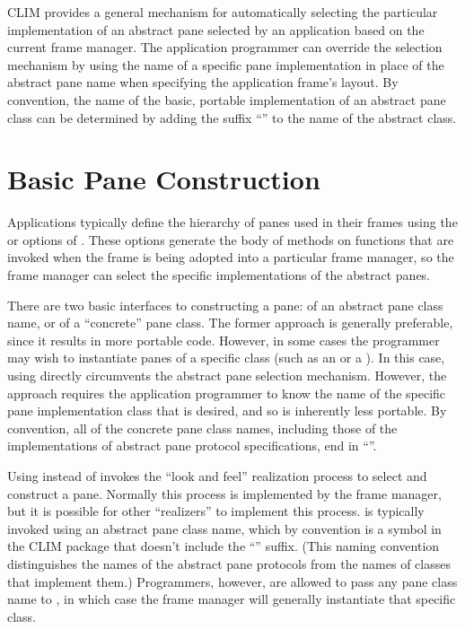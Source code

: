 CLIM provides a general mechanism for automatically selecting the particular
implementation of an abstract pane selected by an application based on the
current frame manager.  The application programmer can override the selection
mechanism by using the name of a specific pane implementation in place of the
abstract pane name when specifying the application frame's layout.  By
convention, the name of the basic, portable implementation of an abstract pane
class can be determined by adding the suffix ``'' to the name of the
abstract class.


\section {Basic Pane Construction}

Applications typically define the hierarchy of panes used in their frames using
the  or  options of .  These
options generate the body of methods on functions that are invoked when the
frame is being adopted into a particular frame manager, so the frame manager can
select the specific implementations of the abstract panes.

There are two basic interfaces to constructing a pane:  of an
abstract pane class name, or  of a ``concrete'' pane class.
The former approach is generally preferable, since it results in more portable
code.  However, in some cases the programmer may wish to instantiate panes of a
specific class (such as an  or a ).  In this case,
using  directly circumvents the abstract pane selection
mechanism.  However, the  approach requires the application
programmer to know the name of the specific pane implementation class that is
desired, and so is inherently less portable.  By convention, all of the concrete
pane class names, including those of the implementations of abstract pane
protocol specifications, end in ``''.

Using  instead of  invokes the ``look and feel''
realization process to select and construct a pane.  Normally this process is
implemented by the frame manager, but it is possible for other ``realizers'' to
implement this process.   is typically invoked using an abstract
pane class name, which by convention is a symbol in the CLIM package that
doesn't include the ``'' suffix.  (This naming convention
distinguishes the names of the abstract pane protocols from the names of classes
that implement them.)  Programmers, however, are allowed to pass any pane class
name to , in which case the frame manager will generally
instantiate that specific class.

